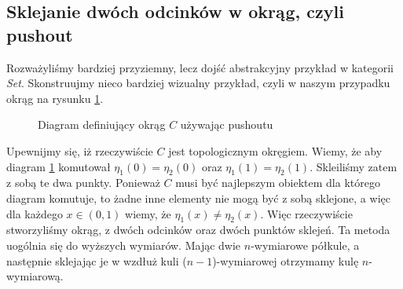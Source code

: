\subsection{Sklejanie dwóch odcinków w okrąg, czyli pushout}
Rozważyliśmy bardziej przyziemny, lecz dojść abstrakcyjny przykład w kategorii \emph{Set}. Skonstruujmy nieco bardziej wizualny przykład, czyli w naszym przypadku okrąg na rysunku \ref{fig:pushout_circ_def}.
\begin{figure}[!htp]
    \centering
    \caption{Diagram definiujący okrąg $C$ używając pushoutu}
    \label{fig:pushout_circ_def}
\end{figure}
Upewnijmy się, iż rzeczywiście $C$ jest topologicznym okręgiem. Wiemy, że aby diagram \ref{fig:pushout_circ_def} komutował $\eta_1(0) = \eta_2(0)$ oraz $\eta_1(1) = \eta_2(1)$. Skleiliśmy zatem z sobą te dwa punkty. Ponieważ $C$ musi być najlepszym obiektem dla którego diagram komutuje, to żadne inne elementy nie mogą być z sobą sklejone, a więc dla każdego $x \in (0, 1)$ wiemy, że $\eta_1(x) \not= \eta_2(x)$. Więc rzeczywiście stworzyliśmy okrąg, z dwóch odcinków oraz dwóch punktów sklejeń. Ta metoda uogólnia się do wyższych wymiarów. Mając dwie $n$-wymiarowe półkule, a następnie sklejając je w wzdłuż kuli ($n-1$)-wymiarowej otrzymamy kulę $n$-wymiarową. 
